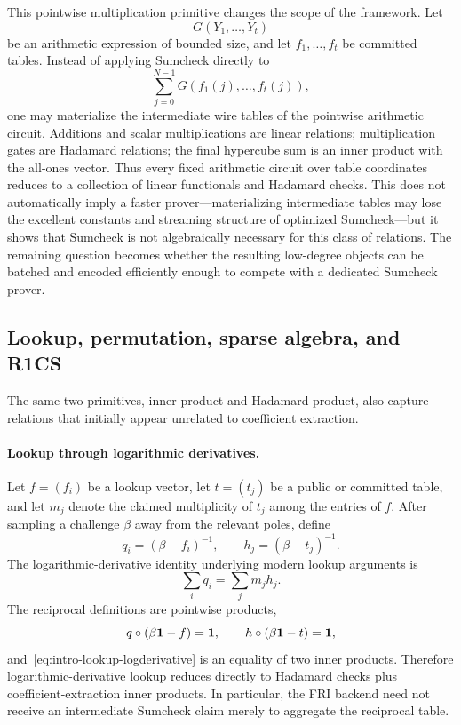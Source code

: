 This pointwise multiplication primitive changes the scope of the framework.  Let
\[
  G(Y_1,\ldots,Y_t)
\]
be an arithmetic expression of bounded size, and let $f_1,\ldots,f_t$ be committed tables.  Instead of applying Sumcheck directly to
\[
  \sum_{j=0}^{N-1}G(f_1(j),\ldots,f_t(j)),
\]
one may materialize the intermediate wire tables of the pointwise arithmetic circuit.  Additions and scalar multiplications are linear relations; multiplication gates are Hadamard relations; the final hypercube sum is an inner product with the all-ones vector.  Thus every fixed arithmetic circuit over table coordinates reduces to a collection of linear functionals and Hadamard checks.  This does not automatically imply a faster prover---materializing intermediate tables may lose the excellent constants and streaming structure of optimized Sumcheck---but it shows that Sumcheck is not algebraically necessary for this class of relations.  The remaining question becomes whether the resulting low-degree objects can be batched and encoded efficiently enough to compete with a dedicated Sumcheck prover.

\subsection{Lookup, permutation, sparse algebra, and R1CS}

The same two primitives, inner product and Hadamard product, also capture relations that initially appear unrelated to coefficient extraction.

\paragraph{Lookup through logarithmic derivatives.}
Let $f=(f_i)$ be a lookup vector, let $t=(t_j)$ be a public or committed table, and let $m_j$ denote the claimed multiplicity of $t_j$ among the entries of $f$.  After sampling a challenge $\beta$ away from the relevant poles, define
\[
  q_i=(\beta-f_i)^{-1},\qquad h_j=(\beta-t_j)^{-1}.
\]
The logarithmic-derivative identity underlying modern lookup arguments is
\begin{equation}
  \sum_i q_i=\sum_jm_jh_j.
  \label{eq:intro-lookup-logderivative}
\end{equation}
The reciprocal definitions are pointwise products,
\[
  q\circ(\beta\mathbf 1-f)=\mathbf 1,
  \qquad
  h\circ(\beta\mathbf 1-t)=\mathbf 1,
\]
and~\eqref{eq:intro-lookup-logderivative} is an equality of two inner products.  Therefore logarithmic-derivative lookup reduces directly to Hadamard checks plus coefficient-extraction inner products.  In particular, the FRI backend need not receive an intermediate Sumcheck claim merely to aggregate the reciprocal table.


